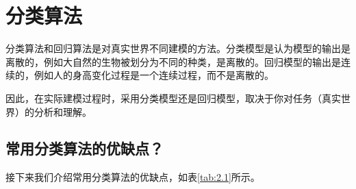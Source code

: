 \section{分类算法}

分类算法和回归算法是对真实世界不同建模的方法。分类模型是认为模型的输出是离散的，例如大自然的生物被划分为不同的种类，是离散的。回归模型的输出是连续的，例如人的身高变化过程是一个连续过程，而不是离散的。

因此，在实际建模过程时，采用分类模型还是回归模型，取决于你对任务（真实世界）的分析和理解。

\subsection{常用分类算法的优缺点？}

接下来我们介绍常用分类算法的优缺点，如表\ref{tab:2.1}所示。

